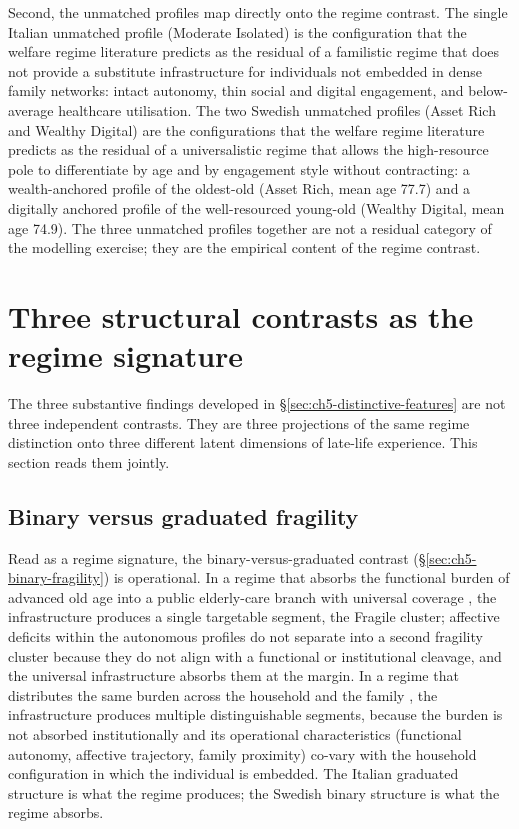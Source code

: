 Second, the unmatched profiles map directly onto the regime contrast. The single Italian unmatched profile (Moderate Isolated) is the configuration that the welfare regime literature predicts as the residual of a familistic regime that does not provide a substitute infrastructure for individuals not embedded in dense family networks: intact autonomy, thin social and digital engagement, and below-average healthcare utilisation. The two Swedish unmatched profiles (Asset Rich and Wealthy Digital) are the configurations that the welfare regime literature predicts as the residual of a universalistic regime that allows the high-resource pole to differentiate by age and by engagement style without contracting: a wealth-anchored profile of the oldest-old (Asset Rich, mean age 77.7) and a digitally anchored profile of the well-resourced young-old (Wealthy Digital, mean age 74.9). The three unmatched profiles together are not a residual category of the modelling exercise; they are the empirical content of the regime contrast.

\section{Three structural contrasts as the regime signature}
\label{sec:ch6-three-contrasts}

The three substantive findings developed in \S\ref{sec:ch5-distinctive-features} are not three independent contrasts. They are three projections of the same regime distinction onto three different latent dimensions of late-life experience. This section reads them jointly.

\subsection{Binary versus graduated fragility}
\label{sec:ch6-binary-graduated}

Read as a regime signature, the binary-versus-graduated contrast (\S\ref{sec:ch5-binary-fragility}) is operational. In a regime that absorbs the functional burden of advanced old age into a public elderly-care branch with universal coverage \citep{anttonen1996}, the infrastructure produces a single targetable segment, the Fragile cluster; affective deficits within the autonomous profiles do not separate into a second fragility cluster because they do not align with a functional or institutional cleavage, and the universal infrastructure absorbs them at the margin. In a regime that distributes the same burden across the household and the family \citep{ferrera1996}, the infrastructure produces multiple distinguishable segments, because the burden is not absorbed institutionally and its operational characteristics (functional autonomy, affective trajectory, family proximity) co-vary with the household configuration in which the individual is embedded. The Italian graduated structure is what the regime produces; the Swedish binary structure is what the regime absorbs.


